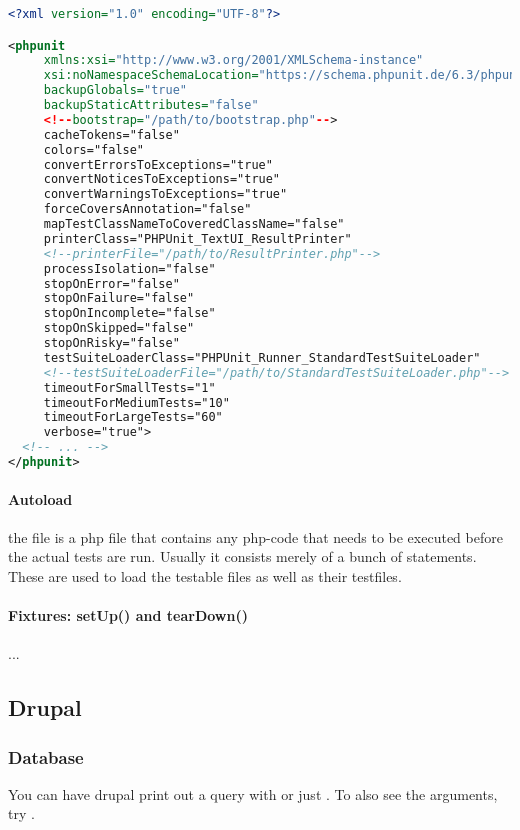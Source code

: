 \begin{lstlisting}[language=xml]
<?xml version="1.0" encoding="UTF-8"?>

<phpunit
     xmlns:xsi="http://www.w3.org/2001/XMLSchema-instance"
     xsi:noNamespaceSchemaLocation="https://schema.phpunit.de/6.3/phpunit.xsd"
     backupGlobals="true"
     backupStaticAttributes="false"
     <!--bootstrap="/path/to/bootstrap.php"-->
     cacheTokens="false"
     colors="false"
     convertErrorsToExceptions="true"
     convertNoticesToExceptions="true"
     convertWarningsToExceptions="true"
     forceCoversAnnotation="false"
     mapTestClassNameToCoveredClassName="false"
     printerClass="PHPUnit_TextUI_ResultPrinter"
     <!--printerFile="/path/to/ResultPrinter.php"-->
     processIsolation="false"
     stopOnError="false"
     stopOnFailure="false"
     stopOnIncomplete="false"
     stopOnSkipped="false"
     stopOnRisky="false"
     testSuiteLoaderClass="PHPUnit_Runner_StandardTestSuiteLoader"
     <!--testSuiteLoaderFile="/path/to/StandardTestSuiteLoader.php"-->
     timeoutForSmallTests="1"
     timeoutForMediumTests="10"
     timeoutForLargeTests="60"
     verbose="true">
  <!-- ... -->
</phpunit>
\end{lstlisting}

\paragraph{Autoload} the file  is a php file that contains any php-code that needs to be executed before the actual tests are run. Usually it consists merely of a bunch of  statements. These are used to load the testable files as well as their testfiles. 

\paragraph{Fixtures: setUp() and tearDown()} ...



\subsection{Drupal}

\subsubsection{Database}

You can have drupal print out a query with  or just . To also see the arguments, try .


